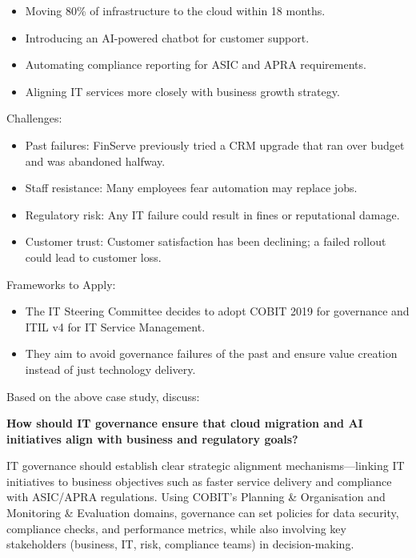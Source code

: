 \begin{itemize}
    \item Moving 80\% of infrastructure to the cloud within 18 months.
    \item Introducing an AI-powered chatbot for customer support.
    \item Automating compliance reporting for ASIC and APRA requirements.
    \item Aligning IT services more closely with business growth strategy.
\end{itemize}

\bigskip

Challenges:

\begin{itemize}
    \item Past failures: FinServe previously tried a CRM upgrade that ran over budget and was abandoned halfway.
    \item Staff resistance: Many employees fear automation may replace jobs.
    \item Regulatory risk: Any IT failure could result in fines or reputational damage.
    \item Customer trust: Customer satisfaction has been declining; a failed rollout could lead to customer loss.
\end{itemize}

\bigskip

Frameworks to Apply:

\begin{itemize}
    \item The IT Steering Committee decides to adopt COBIT 2019 for governance and ITIL v4 for IT Service Management.
    \item They aim to avoid governance failures of the past and ensure value creation instead of just technology delivery.
\end{itemize}

\bigskip

Based on the above case study, discuss:

\noindent\textbf{How should IT governance ensure that cloud migration and AI initiatives align with business and regulatory goals?}


IT governance should establish clear strategic alignment mechanisms—linking IT initiatives to business objectives such as faster service delivery and compliance with ASIC/APRA regulations. Using COBIT’s Planning \& Organisation and Monitoring \& Evaluation domains, governance can set policies for data security, compliance checks, and performance metrics, while also involving key stakeholders (business, IT, risk, compliance teams) in decision-making.


